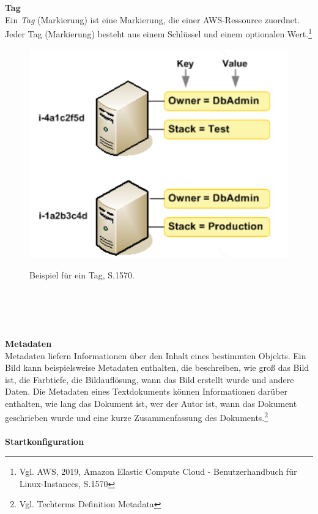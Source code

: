 \\\\
\textbf{Tag}\\
Ein \textit{Tag} (Markierung) ist eine Markierung, die einer AWS-Ressource zuordnet. Jeder Tag (Markierung) besteht aus einem Schlüssel und einem optionalen Wert.\footnote{Vgl. AWS, 2019, Amazon Elastic Compute Cloud - Benutzerhandbuch für Linux-Instances, S.1570\cite{AMZ26}}
\begin{figure}[h!]
  \centering
  \includegraphics[scale=0.4]{sources/TagExample}
  \caption[Beispiel für ein Tag]{}\label{fig:TagExample}
  Beispiel für ein Tag{\cite{AMZ26}, S.1570}.
\end{figure}
\\\\
\\\\
\textbf{Metadaten}\\
Metadaten liefern Informationen über den Inhalt eines bestimmten Objekts. Ein Bild kann beispielsweise Metadaten enthalten, die beschreiben, wie groß das Bild ist, die Farbtiefe, die Bildauflösung, wann das Bild erstellt wurde und andere Daten. Die Metadaten eines Textdokuments können Informationen darüber enthalten, wie lang das Dokument ist, wer der Autor ist, wann das Dokument geschrieben wurde und eine kurze Zusammenfassung des Dokuments.\footnote{Vgl. Techterms Definition Metadata\cite{MET}}
\\\\
\textbf{Startkonfiguration}\\
